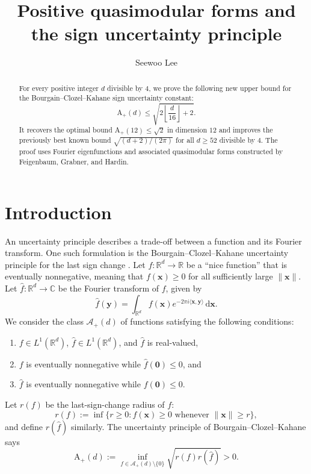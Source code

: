 \documentclass[10pt,reqno]{amsproc}
\title{Positive quasimodular forms and the sign uncertainty principle}
\author{Seewoo Lee}
\date{}
\newcommand{\what}[1]{\widehat{#1}}
\newcommand{\dd}{\mathrm{d}}
\newcommand{\rA}{\mathrm{A}}
\newcommand{\bC}{\mathbb{C}}
\newcommand{\bR}{\mathbb{R}}
\newcommand{\bx}{\mathbf{x}}
\newcommand{\by}{\mathbf{y}}
\newcommand{\1}{\mathds{1}}	%
\theoremstyle{definition}
\theoremstyle{remark}
\begin{document}
\begin{abstract}
    For every positive integer $d$ divisible by $4$, we prove the following new upper bound for the Bourgain--Clozel--Kahane sign uncertainty constant:
    \[
        \rA_+(d) \le \sqrt{2 \left\lfloor \frac{d}{16} \right\rfloor + 2}.
    \]
    It recovers the optimal bound $\rA_+(12) \le \sqrt{2}$ in dimension $12$ and improves the previously best known bound $\sqrt{(d+2)/(2\pi)}$ for all $d \ge 52$ divisible by $4$.
    The proof uses Fourier eigenfunctions and associated quasimodular forms constructed by Feigenbaum, Grabner, and Hardin.
\end{abstract}

\maketitle

\section{Introduction}

An uncertainty principle describes a trade-off between a function and its Fourier transform.
One such formulation is the Bourgain--Clozel--Kahane uncertainty principle for the last sign change \cite{bourgain2010principe}.
Let $f: \bR^d \to \bR$ be a ``nice function'' that is eventually nonnegative, meaning that $f(\bx) \ge 0$ for all sufficiently large $\|\bx\|$.
Let $\what{f}: \bR^d \to \bC$ be the Fourier transform of $f$, given by
\[
\what{f}(\by) = \int_{\bR^d} f(\bx) e^{-2\pi i \langle \bx, \by \rangle} \, \dd \bx.
\]
We consider the class $\mathcal{A}_+(d)$ of functions satisfying the following conditions:
\begin{enumerate}
    \item $f \in L^1(\bR^d)$, $\what{f} \in L^1(\bR^d)$, and $\what{f}$ is real-valued,
    \item $f$ is eventually nonnegative while $\what{f}(\mathbf{0}) \le 0$, and
    \item $\what{f}$ is eventually nonnegative while $f(\mathbf{0}) \le 0$.
\end{enumerate}
Let $r(f)$ be the last-sign-change radius of $f$:
\[
r(f) := \inf \{ r \ge 0 : f(\bx) \ge 0 \text{ whenever } \|\bx\| \ge r \},
\]
and define $r(\what{f})$ similarly.
The uncertainty principle of Bourgain--Clozel--Kahane says \cite[Th\'eor\`eme 3.1]{bourgain2010principe}
\[
\rA_{+}(d) := \inf_{f \in \mathcal{A}_+(d) \setminus \{0\}} \sqrt{r(f) r(\what{f})} > 0.
\]
\end{document}
